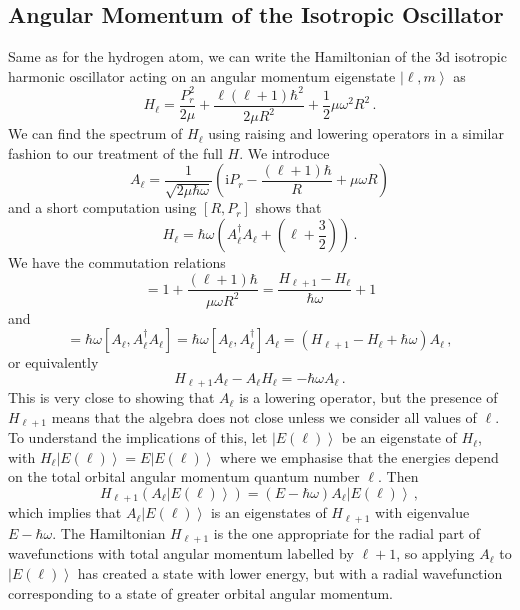 \documentclass{article}
\theoremstyle{plain}\theoremheaderfont{\normalfont\itshape}\theorembodyfont{\rmfamily}\theoremseparator{.}\newtheorem*{rem}{Remark}\newtheorem*{ex}{Example}\newtheorem*{proof}{Proof}\newtheorem*{altp}{Alternative proof}
\theoremstyle{plain}\theoremheaderfont{\normalfont\bfseries}\theorembodyfont{\rmfamily}\theoremseparator{.}\newtheorem{thm}{Theorem}[section]\newtheorem{lem}[thm]{Lemma}\newtheorem{prop}[thm]{Proposition}\newtheorem*{cor}{Corollary}\newtheorem{defn}[thm]{Definition}\newtheorem{clm}[thm]{Claim}\newtheorem{clminproof}{Claim}
\theoremstyle{break}\theoremheaderfont{\normalfont\itshape}\theorembodyfont{\rmfamily}\theoremseparator{.\medskip}\newtheorem*{proofskip}{Proof}\newtheorem*{exs}{Examples}\newtheorem*{rems}{Remarks}
\theoremstyle{break}\theoremheaderfont{\normalfont\bfseries}\theorembodyfont{\rmfamily}\theoremseparator{.\medskip}\newtheorem{lemskip}[thm]{Lemma}\newtheorem{defnskip}[thm]{Definition}\newtheorem{propskip}[thm]{Proposition}\newtheorem{thmskip}[thm]{Theorem}
\numberwithin{equation}{section}
\newcommand{\ii}{\mathrm{i}}
\newcommand{\ket}[1]{\left| #1 \right\rangle}
\begin{document}
    \subsection{Angular Momentum of the Isotropic Oscillator}
    Same as for the hydrogen atom, we can write the Hamiltonian of the 3d isotropic harmonic oscillator acting on an angular momentum eigenstate \(\ket{\ell,m}\) as
    \begin{equation}
        H_\ell =\frac{P_r^2}{2\mu}+\frac{\ell(\ell+1)\hbar^2}{2\mu R^2}+\frac{1}{2}\mu\omega^2 R^2\,.
    \end{equation}
    We can find the spectrum of \(H_\ell\) using raising and lowering operators in a similar fashion to our treatment of the full \(H\). We introduce
    \begin{equation}
        A_\ell=\frac{1}{\sqrt{2\mu\hbar\omega}}\left(\ii P_r-\frac{(\ell+1)\hbar}{R}+\mu\omega R\right)
    \end{equation}
    and a short computation using \([R,P_r]\) shows that
    \begin{equation}
        H_\ell=\hbar\omega\left(A_\ell^\dagger A_\ell+\left(\ell+\frac{3}{2}\right)\right)\,.
    \end{equation}
    We have the commutation relations
    \begin{equation}
        [A_\ell,A_\ell^\dagger]=1+\frac{(\ell+1)\hbar}{\mu\omega R^2}=\frac{H_{\ell+1}-H_{\ell}}{\hbar\omega}+1
    \end{equation}
    and
    \begin{equation}
        [A_\ell,H_\ell]=\hbar\omega[A_\ell,A_\ell^\dagger A_\ell]=\hbar\omega[A_\ell,A_\ell^\dagger]A_\ell=(H_{\ell+1}-H_{\ell}+\hbar\omega)A_\ell\,,
    \end{equation}
    or equivalently
    \begin{equation}\label{Al_Hl_commutator}
        H_{\ell+1}A_\ell-A_\ell H_\ell=-\hbar\omega A_\ell\,.
    \end{equation}
    This is very close to showing that \(A_\ell\) is a lowering operator, but the presence of \(H_{\ell+1}\) means that the algebra does not close unless we consider all values of \(\ell\). To understand the implications of this, let \(\ket{E(\ell)}\) be an eigenstate of \(H_\ell\), with \(H_\ell \ket{E(\ell)}=E\ket{E(\ell)}\) where we emphasise that the energies depend on the total orbital angular momentum quantum number \(\ell\). Then
    \begin{equation}
        H_{\ell+1}(A_\ell\ket{E(\ell)})=(E-\hbar\omega)A_\ell\ket{E(\ell)}\,,
    \end{equation}
    which implies that \(A_{\ell}\ket{E(\ell)}\) is an eigenstates of \(H_{\ell+1}\) with eigenvalue \(E-\hbar\omega\). The Hamiltonian \(H_{\ell+1}\)  is the one appropriate for the radial part of wavefunctions with total angular momentum labelled by \(\ell+1\), so applying \(A_\ell\) to \(\ket{E(\ell)}\) has created a state with lower energy, but with a radial wavefunction corresponding to a state of greater orbital angular momentum.
\end{document}
